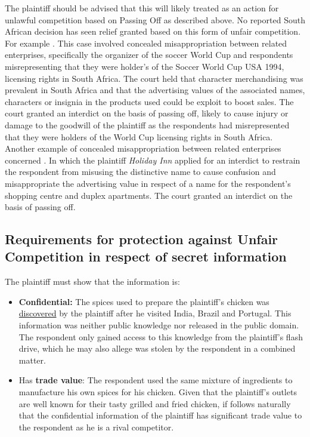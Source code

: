 \documentclass[11pt]{article}
\begin{document}
The plaintiff should be advised that this will likely treated as an action for
unlawful competition based on Passing Off as described above. No reported South
African decision has seen relief granted based on this form of unfair
competition.\\

For example  \cite{joffe94_fifa_bartlett}. This
case involved concealed misappropriation between related enterprises,
specifically the organizer of the soccer
World Cup and respondents misrepresenting that they were holder's of the Soccer
World Cup USA 1994, licensing rights in South Africa. The court held that
character merchandising was prevalent in South Africa and that the advertising
values of the associated names, characters or insignia in the products used
could be exploit to boost sales. The court granted an interdict on the basis of
passing off, likely to cause injury or damage to the goodwill of the plaintiff
as the respondents had misrepresented that they were holders of the World Cup
licensing rights in South Africa.\\

Another example of concealed misappropriation between related enterprises
concerned 
\cite{holmes77_capital_v_holiday}. In which the plaintiff \emph{Holiday Inn} applied
for an interdict to restrain the respondent from misusing the distinctive name to
cause confusion and misappropriate the advertising value in respect of a name
for the respondent's shopping centre and duplex apartments. The court granted an
interdict on the basis of passing off.
\subsection{Requirements for protection against Unfair Competition in respect of secret information}
\label{sec:org8ffe82d}

The plaintiff must show that the information is:
\begin{itemize}
\item \textbf{Confidential:} The spices used to prepare the plaintiff's chicken was
\uline{discovered} by the plaintiff after he visited India, Brazil and
Portugal. This information was neither public knowledge nor released in the
public domain. The respondent only gained access to this knowledge from the
plaintiff's flash drive, which he may also allege was stolen by the respondent
in a combined matter.
\item Has \textbf{trade value}: The respondent used the same mixture of ingredients to
manufacture his own spices for his chicken. Given that the plaintiff's outlets
are well known for their tasty grilled and fried chicken, if follows naturally
that the confidential information of the plaintiff has significant trade value
to the respondent as he is a rival competitor.
\end{itemize}
\end{document}
